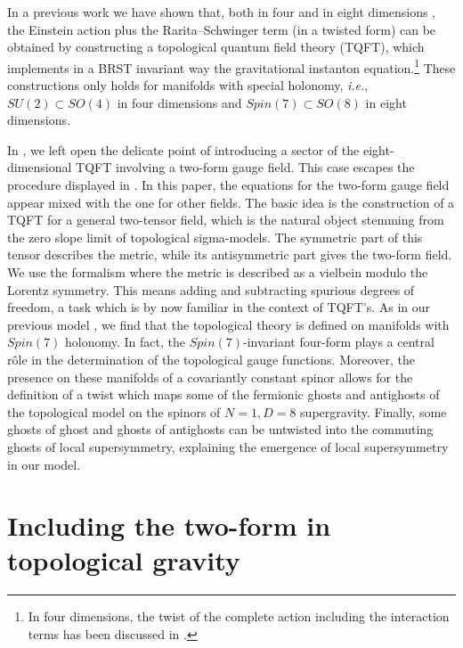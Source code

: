 \documentclass[a4paper,12pt]{article}
\def\L{l}
\begin{document}
In a previous work we have shown that, both in four \cite{BT1} and in
eight dimensions \cite{BT2}, the   Einstein action plus the
Rarita--Schwinger term (in a twisted form) can  be obtained  by
constructing a topological quantum field theory (TQFT), which
implements in a BRST invariant way the gravitational instanton
equation.\footnote{In four dimensions, the twist of the complete action
including the interaction terms has been discussed in \cite{mespe}.}
These constructions only holds for  manifolds with special holonomy,
{\em i.e.}, $SU(2)\subset SO(4)$ in four dimensions and $Spin(7)\subset
SO(8)$ in eight dimensions.

In \cite{BT2}, we left open the delicate point of 
introducing  a sector of the eight-dimensional TQFT involving a two-form
gauge field. This case escapes the
procedure displayed in \cite {laroche}. 
In this paper, the equations for the two-form gauge field
appear mixed with the one for other fields. 
The basic idea is the construction of a TQFT for a general two-tensor
field, which is the natural object stemming from the
zero slope limit of topological sigma-models. The symmetric part
of this tensor describes the metric,
while its antisymmetric part gives the two-form field.
We use the formalism where the metric is described as 
a vielbein modulo the Lorentz symmetry.
This means adding and subtracting spurious
degrees of freedom, a task which is by now familiar in the context of
TQFT's. 
As in our previous model \cite{BT2}, 
we find that the topological theory is defined on manifolds with
$Spin(7)$ holonomy. In fact, the $Spin(7)$-invariant four-form
plays a central r\^ole in the determination of the topological gauge functions. 
Moreover, the presence on these manifolds of a covariantly constant
spinor allows for the definition of a twist \cite{BT2}
which maps some of the fermionic ghosts and antighosts of the topological
model on the spinors of $N=1, D=8$ supergravity.
Finally, some ghosts of ghost and ghosts of antighosts can be untwisted
into the commuting ghosts of local supersymmetry, explaining the emergence
of local supersymmetry in our model.

\let\w=\wedge
\let\o=\omega
\let\O=\Omega
\def\L{ {\cal L}}
 \section{Including the two-form in topological gravity }  
\end{document}
